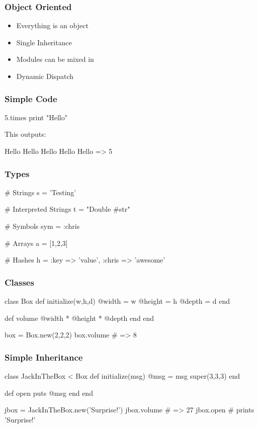 \begin{frame}
  \frametitle{Object Oriented}
  \begin{itemize}
  \item Everything is an object
  \pause
  \item Single Inheritance
  \pause
  \item Modules can be mixed in
  \pause
  \item Dynamic Dispatch
  \end{itemize}
\end{frame}

\begin{frame}[fragile]
  \frametitle{Simple Code}
  \begin{rubycode}
    5.times { print "Hello" }
  \end{rubycode}
  \pause
  This outputs:
  \begin{console}
    Hello
    Hello
    Hello
    Hello
    Hello
    => 5
  \end{console}
\end{frame}

\begin{frame}[fragile]
  \frametitle{Types}
  \begin{rubycode}
    # Strings
    s = 'Testing'

    # Interpreted Strings
    t = "Double #{str}"

    # Symbols
    sym = :chris

    # Arrays
    a = [1,2,3]

    # Hashes
    h = { :key => 'value', :chris => 'awesome' }
  \end{rubycode}
\end{frame}

\begin{frame}[fragile]
  \frametitle{Classes}
  \begin{rubycode}
    class Box
      def initialize(w,h,d)
        @width = w
        @height = h
        @depth = d
      end

      def volume
        @width * @height * @depth
      end
    end

    box = Box.new(2,2,2)
    box.volume # => 8
  \end{rubycode}
\end{frame}

\begin{frame}[fragile]
  \frametitle{Simple Inheritance}
  \begin{rubycode}
    class JackInTheBox < Box
      def initialize(msg)
        @msg = msg
        super(3,3,3)
      end

      def open
        puts @msg
      end
    end

    jbox = JackInTheBox.new('Surprise!')
    jbox.volume # => 27
    jbox.open # prints 'Surprise!'
  \end{rubycode}
\end{frame}

